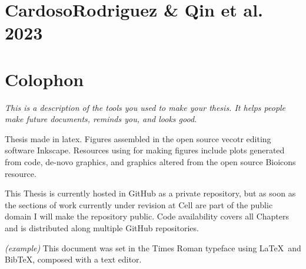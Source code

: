 \chapter{CardosoRodriguez \& Qin et al. 2023}
\label{appendix:preprint}





\chapter{Colophon}
\label{appendix3label}
\textit{This is a description of the tools you used to make your thesis. It helps people make future documents, reminds you, and looks good.}

Thesis made in latex. Figures assembled in the open source vecotr editing software Inkscape. Resources using for making figures include plots generated from code, de-novo graphics, and graphics altered from the open source Bioicons resource. 

This Thesis is currently hosted in GitHub as a private repository, but as soon as the sections of work currently under revision at Cell are part of the public domain I will make the repository public. Code availability covers all Chapters and is distributed along multiple GitHub repositories.

\textit{(example)} This document was set in the Times Roman typeface using \LaTeX\ and Bib\TeX , composed with a text editor. 

